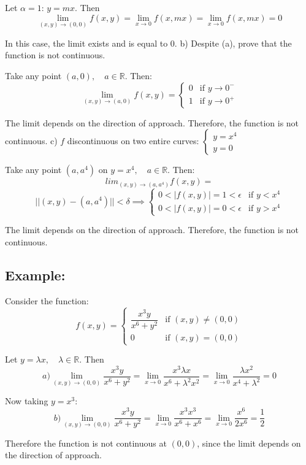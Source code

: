 \documentclass[11pt]{article}
\begin{document}
Let $\alpha = 1$: $y = mx$. Then
\[
\lim_{(x,y) \to (0,0)} f(x,y) = \lim_{x \to 0} f(x,mx) = \lim_{x \to 0} f(x,mx) = 0
\]

In this case, the limit exists and is equal to 0.
\vskip 0.5cm
b) Despite (a), prove that the function is not continuous.

Take any point $(a,0), \quad a \in \mathbb{R}$. Then:
\[
\lim_{(x,y) \to (a,0)} f(x,y) = 
\begin{cases}
    0 & \text{if } y \to 0^- \\
    1 & \text{if } y \to 0^+
\end{cases}
\]

The limit depends on the direction of approach. Therefore, the function is not continuous.
\vskip 0.5cm
c) $f$ discontinuous on two entire curves:
$\begin{cases}
    y = x^4 \\
    y = 0
\end{cases}$

Take any point $(a,a^4)$ on $y = x^4, \quad a \in \mathbb{R}$. Then:
\[
lim_{(x,y) \to (a,a^4)} f(x,y) = 
\]
\[
||(x,y) - (a,a^4)|| < \delta \implies
\begin{cases}
    0 < |f(x,y)| = 1 < \epsilon & \text{if } y < x^4 \\
    0 < |f(x,y)| = 0 < \epsilon & \text{if } y > x^4
\end{cases}
\]

The limit depends on the direction of approach. Therefore, the function is not continuous.

\subsection*{Example:}
Consider the function:
\[
f(x,y) =
\begin{cases}
    \dfrac{x^3y}{x^6 + y^2} & \text{if } (x,y) \neq (0,0) \\
    0 & \text{if } (x,y) = (0,0)
\end{cases}
\]

Let $y = \lambda x, \quad \lambda \in \mathbb{R}$. Then
\[
a) \lim_{(x,y) \to (0,0)} \frac{x^3y}{x^6 + y^2} = \lim_{x \to 0} \frac{x^3 \lambda x}{x^6 + \lambda^2 x^2} = \lim_{x \to 0} \frac{\lambda x^2}{x^4 + \lambda^2} = 0
\]

Now taking $y = x^3$:
\[
b) \lim_{(x,y) \to (0,0)} \frac{x^3y}{x^6 + y^2} = \lim_{x \to 0} \frac{x^3 x^3}{x^6 + x^6} = \lim_{x \to 0} \frac{x^6}{2x^6} = \frac{1}{2}
\]

Therefore the function is not continuous at $(0,0)$, since the limit depends on the direction of approach.
\end{document}
